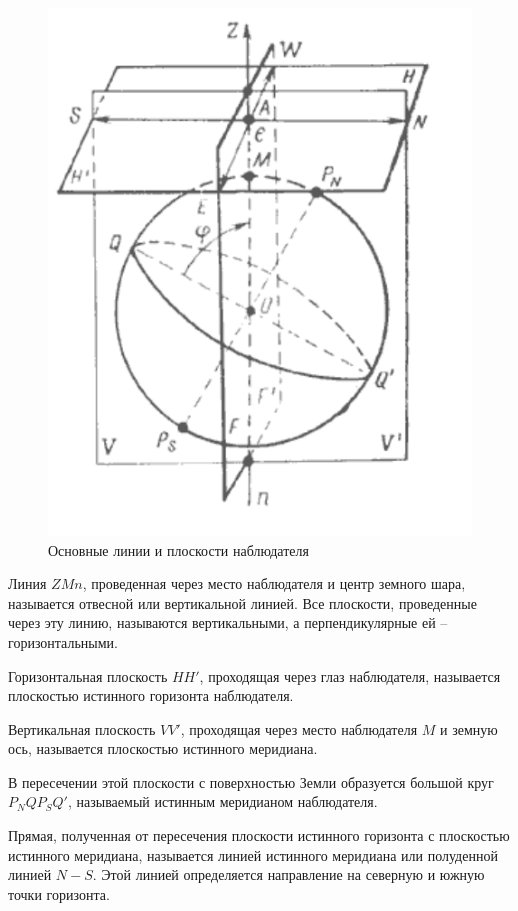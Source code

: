 \documentclass[a4paper, 12pt, twoside, final, book, russian, fittopage, cyremdash]{ncc}
\begin{document}
\begin{figure}[htb]
  \centering{}
  \includegraphics{N004}
  \caption{Основные линии и плоскости наблюдателя}
  \label{fig:N4}
\end{figure}

Линия $ZMn$, проведенная через место наблюдателя и центр земного шара, называется отвесной или вертикальной линией. Все плоскости, проведенные через эту линию, называются вертикальными, а перпендикулярные ей \--- горизонтальными. 

Горизонтальная плоскость $HH'$, проходящая через глаз наблюдателя, называется плоскостью истинного горизонта наблюдателя. 

Вертикальная плоскость $VV'$, проходящая через место наблюдателя $M$ и земную ось, называется плоскостью истинного меридиана. 

В пересечении этой плоскости с поверхностью Земли образуется большой круг $P_NQP_SQ'$, называемый истинным меридианом наблюдателя. 

Прямая, полученная от пересечения плоскости истинного горизонта с плоскостью истинного меридиана, называется линией истинного меридиана или полуденной линией $N-S$. Этой линией определяется направление на северную и южную точки горизонта. 
\end{document}
